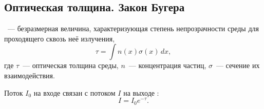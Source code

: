 \subsection{Оптическая толщина. Закон Бугера}
~--- безразмерная величина, характеризующая степень непрозрачности среды для проходящего сквозь неё излучения,
\begin{equation}
\tau = \int n(x) \sigma(x)\,dx,
\end{equation}
где $\tau$~--- оптическая толщина среды, $n$~--- концентрация частиц, $\sigma$~--- сечение их взаимодействия.

Поток $I_0$ на входе связан с потоком $I$ на выходе :
\begin{equation}
I = I_0 e^{-\tau}.
\end{equation}